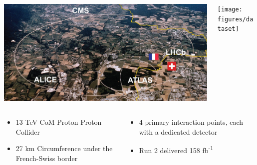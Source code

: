 \documentclass{beamer}
\newcommand*{\header}[1]{\fontsize{16}{8}\selectfont \textbf{{\color{MyPurple}{#1}}}}
\begin{document}
\begin{frame}
\begin{center}
\header{The Large Hadron Collider}
\end{center}
\begin{columns}
\begin{column}{0.6\textwidth}
\includegraphics[width=1\textwidth]{figures/LHC}
\end{column}
\begin{column}{0.4\textwidth}
\texttt{[image: figures/dataset]}
\end{column}
\end{columns}
\begin{columns}
\begin{column}{0.5\textwidth}
\begin{itemize}
\small
\item 13 TeV CoM Proton-Proton Collider
\item 27 km Circumference under the French-Swiss border
\end{itemize}
\end{column}
\begin{column}{0.5\textwidth}
\begin{itemize}
\small
\item 4 primary interaction points, each with a dedicated detector
\item Run 2 delivered 158 fb\textsuperscript{-1}
\end{itemize}
\end{column}
\end{columns}
\end{frame}
\end{document}
